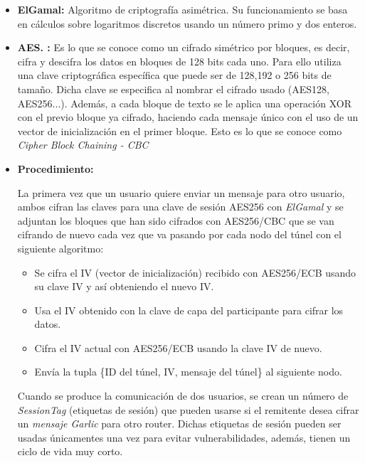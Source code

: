 \begin{itemize}

\item \textbf{ElGamal:}
Algoritmo de criptografía asimétrica. Su funcionamiento se basa en cálculos sobre logaritmos discretos usando un número primo y dos enteros.   


\item \textbf{AES. :}
Es lo que se conoce como un cifrado simétrico por bloques, es decir, cifra y descifra los datos en bloques de 128 bits cada uno. Para ello utiliza una clave criptográfica específica que puede ser de 128,192 o 256 bits de tamaño. Dicha clave se especifica al nombrar el cifrado usado (AES128, AES256...). Además, a cada bloque de texto se le aplica una operación XOR con el previo bloque ya cifrado, haciendo cada mensaje único con el uso de un vector de inicialización en el primer bloque. Esto es lo que se conoce como \textit{Cipher Block Chaining - CBC} 


\item \textbf{Procedimiento:} 



La primera vez que un usuario quiere enviar un mensaje para otro usuario, ambos cifran las claves para una clave de sesión AES256 con \textit{ElGamal} y se adjuntan los bloques que han
sido cifrados con AES256/CBC que se van cifrando de nuevo cada vez que va pasando por cada nodo del túnel con el siguiente algoritmo:

\begin{itemize}
	\item Se cifra el IV (vector de inicialización) recibido con AES256/ECB usando su clave IV y así obteniendo el nuevo IV.
	\item Usa el IV obtenido con la clave de capa del participante para cifrar los datos.
	\item Cifra el IV actual con AES256/ECB usando la clave IV de nuevo.
	\item Envía la tupla \{ID del túnel, IV, mensaje del túnel\} al siguiente nodo.
\end{itemize}



Cuando se produce la comunicación de dos usuarios, se crean un número de \textit{SessionTag} (etiquetas de sesión) que pueden usarse si el remitente desea cifrar un \textit{mensaje Garlic} para otro router. Dichas etiquetas de sesión pueden ser usadas únicamentes una vez para evitar vulnerabilidades, además, tienen un ciclo de vida muy corto.


\end{itemize}




